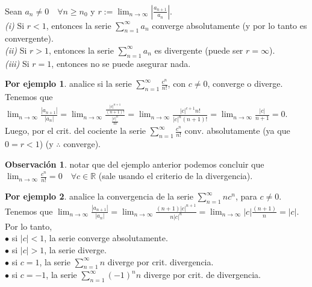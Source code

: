 \documentclass{article}
\theoremstyle{definition}
\newtheorem*{obs}{Observación}
\newtheorem*{ej}{Por ejemplo}
\theoremstyle{remark}
\begin{document}
\begin{teo} \; \\
Sean $a_n \neq 0 \quad \forall n \geq n_0$ y $r := \lim_{n\to\infty}{ \left| \frac{a_{n+1}}{a_n} \right|}$. \\ 
\emph{(i)} \quad Si $r<1$, entonces la serie $\sum_{n=1}^{\infty}{a_n}$ converge absolutamente (y por lo tanto es convergente). \\
\emph{(ii)} \quad Si $r>1$, entonces la serie $\sum_{n=1}^{\infty}{a_n}$ es divergente (puede ser $r=\infty$). \\
\emph{(iii)} \quad Si $r=1$, entonces no se puede asegurar nada.
\end{teo}


\begin{ej} analice si la serie $\sum_{n=1}^{\infty}{\frac{c^n}{n!}}$, con $c\neq0$, converge o diverge. \\
  Tenemos que $\lim_{n\to\infty}{\frac{|a_{n+1}|}{|a_n|}}=\lim_{n\to\infty}{\frac{\frac{|c|^{n+1}}{(n+1)!}}{\frac{|c|^n}{n!}}}=\lim_{n\to\infty}{\frac{|c|^{c+1}n!}{|c|^n(n+1)!}}=\lim_{n\to\infty}{\frac{|c|}{n+1}}=0.$ \\ Luego, por el crit. del cociente la serie $\sum_{n=1}^{\infty}{\frac{c^n}{n!}}$ conv. absolutamente (ya que $0 = r < 1$) (y $\therefore$ converge). \\
\end{ej}

\begin{obs}
  notar que del ejemplo anterior podemos concluir que \\$\lim_{n\to\infty}{\frac{c^n}{n!}}=0 \quad \forall c \in \mathbb{R}$ (sale usando el criterio de la divergencia).
\end{obs}

\pagebreak
\begin{ej}
  analice la convergencia de la serie $\sum_{n=1}^{\infty}{nc^n}$, para $c \neq 0$. \\
  Tenemos que $\lim_{n\to\infty}{\frac{|a_{n+1}|}{|a_n|}}=\lim_{n\to\infty}{\frac{(n+1)|c|^{n+1}}{n|c|^n}}=\lim_{n\to\infty}{|c| \frac{(n+1)}{n}}=|c|.$ Por lo tanto, \\
  $\bullet$ \quad si $|c| < 1$, la serie converge absolutamente. \\
  $\bullet$ \quad si $|c| > 1$, la serie diverge. \\
  $\bullet$ \quad si $c=1$, la serie $\sum_{n=1}^{\infty}{n}$ diverge por crit. divergencia. \\
  $\bullet$ \quad si $c=-1$, la serie $\sum_{n=1}^{\infty}{(-1)^nn}$ diverge por crit. de divergencia.
\end{ej}
\end{document}
